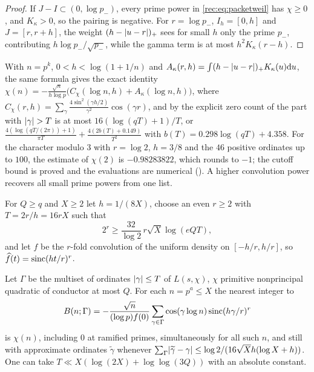\begin{proof}
If $J-I\subset(0,\log p_-)$, every prime power in \eqref{rec:eq:packetweil} has $\chi\ge0$, and
$K_\kappa>0$, so the pairing is negative. For $r=\log p_-$, $I_h=[0,h]$ and $J=[r,r+h]$, the weight
$(h-\lvert u-r\rvert)_+$ sees for small $h$ only the prime $p_-$, contributing $h\log p_-/\sqrt{p_-}$, while
the gamma term is at most $h^2K_\kappa(r-h)$.
\end{proof}

With $n=p^k$, $0<h<\log(1+1/n)$ and $A_\kappa(r,h)=\int(h-\lvert u-r\rvert)_+K_\kappa(u)\mathrm{d} u$, the same formula
gives the exact identity
$\chi(n)=-\frac{\sqrt n}{h\log p}\bigl(C_\chi(\log n,h)+A_\kappa(\log n,h)\bigr)$, where
$C_\chi(r,h)=\sum_\gamma\frac{4\sin^2(\gamma h/2)}{\gamma^2}\cos(\gamma r)$, and by the explicit zero count
of \cite{BennettMartinOBryantRechnitzer2021Counting} the part with $\lvert\gamma\rvert>T$ is at most
$16(\log(qT)+1)/T$, or
$\frac{4(\log(qT/(2\pi))+1)}{\pi T}+\frac{4(2b(T)+0.149)}{T^2}$ with $b(T)=0.298\log(qT)+4.358$. For
the character modulo $3$ with $r=\log2$, $h=3/8$ and the $46$ positive ordinates up to $100$, the
estimate of $\chi(2)$ is $-0.98283822$, which rounds to $-1$; the cutoff bound is proved and the
evaluations are numerical (). A higher convolution
power recovers all small prime powers from one list.

For $Q\ge q$ and $X\ge2$ let $h=1/(8X)$, choose an even $r\ge2$ with $T=2r/h=16rX$ such that
\begin{equation}\label{rec:eq:choose}
 2^r\ge\frac{32}{\log2}\,r\sqrt X\log(eQT),
\end{equation}
and let $f$ be the $r$-fold convolution of the uniform density on $[-h/r,h/r]$, so
$\widehat f(t)=\operatorname{sinc}(ht/r)^r$.

\begin{theorem}\label{rec:thm:quaddecode}
Let $\Gamma$ be the multiset of ordinates $\lvert\gamma\rvert\le T$ of $L(s,\chi)$, $\chi$ primitive
nonprincipal quadratic of conductor at most $Q$. For each $n=p^a\le X$ the nearest integer to
\[
 B(n;\Gamma)=-\frac{\sqrt n}{(\log p)f(0)}\sum_{\gamma\in\Gamma}\cos(\gamma\log n)\operatorname{sinc}(h\gamma/r)^r
\]
is $\chi(n)$, including $0$ at ramified primes, simultaneously for all such $n$, and still with
approximate ordinates $\widetilde\gamma$ whenever
$\sum_\Gamma\lvert\widetilde\gamma-\gamma\rvert\le\log2/(16\sqrt Xh(\log X+h))$. One can take
$T\ll X(\log(2X)+\log\log(3Q))$ with an absolute constant.
\end{theorem}


